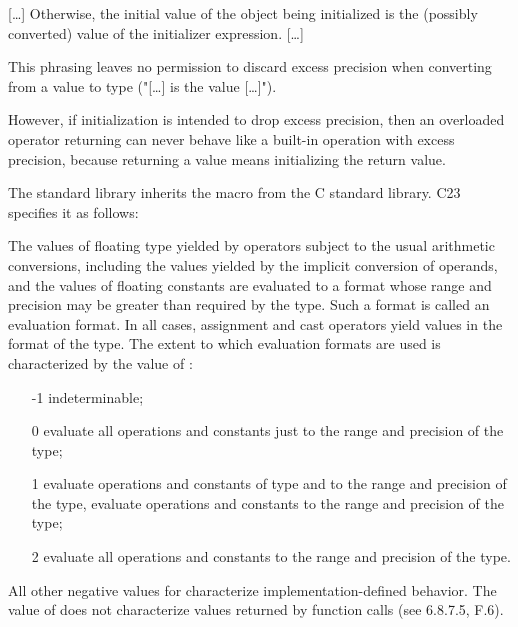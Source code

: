 \begin{wgText}
  \setcounter{Paras}{0}
  [\ldots]
  Otherwise, the initial value of the object being initialized is the (possibly
  converted) value of the initializer expression.
  [\ldots]
\end{wgText}

This phrasing leaves no permission to discard excess precision when converting
from a \float value to type \float ("[\ldots] is the value [\ldots]").

However, if initialization is intended to drop excess precision, then an
overloaded operator returning \float can never behave like a built-in operation
with excess precision, because returning a value means initializing the return
value.

The \CC{} standard library inherits the  macro from the C
standard library. C23 specifies it as follows:

\begin{wgText}
  \setcounter{Paras}{25}\pnum
  The values of floating type yielded by operators subject to the usual
  arithmetic conversions, including the values yielded by the implicit
  conversion of operands, and the values of floating constants are evaluated to
  a format whose range and precision may be greater than required by the type.
  Such a format is called an evaluation format.
  In all cases, assignment and cast operators yield values in the format of the
  type.
  The extent to which evaluation formats are used is characterized by the value
  of :
  \begin{itemize}
    \item [-1] indeterminable;

    \item [0] evaluate all operations and constants just to the range and
      precision of the type;

    \item [1] evaluate operations and constants of type \float and \double to
      the range and precision of the \double type, evaluate 
      operations and constants to the range and precision of the  type;

    \item [2] evaluate all operations and constants to the range and precision
      of the  type.
  \end{itemize}
  All other negative values for  characterize
  implementation-defined behavior.
  The value of  does not characterize values returned by
  function calls (see 6.8.7.5, F.6).
\end{wgText}

